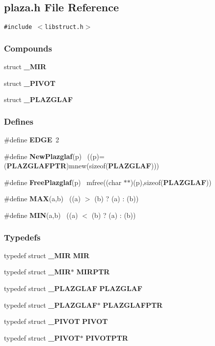 \subsection{plaza.h File Reference}
\label{plaza.h}
{\tt \#include $<$libstruct.h$>$}\par
\subsubsection*{Compounds}
\begin{CompactItemize}
\item 
struct {\bf \_\-MIR}
\item 
struct {\bf \_\-PIVOT}
\item 
struct {\bf \_\-PLAZGLAF}
\end{CompactItemize}
\subsubsection*{Defines}
\begin{CompactItemize}
\item 
\#define {\bf EDGE}\ 2
\item 
\#define {\bf New\-Plazglaf}(p) \ ((p)=({\bf PLAZGLAFPTR})mnew(sizeof({\bf PLAZGLAF})))
\item 
\#define {\bf Free\-Plazglaf}(p) \ mfree((char $\ast$$\ast$)(p),sizeof({\bf PLAZGLAF}))
\item 
\#define {\bf MAX}(a,b) \ ((a) $>$ (b) ? (a) : (b))
\item 
\#define {\bf MIN}(a,b) \ ((a) $<$ (b) ? (a) : (b))
\end{CompactItemize}
\subsubsection*{Typedefs}
\begin{CompactItemize}
\item 
typedef struct {\bf \_\-MIR}
 {\bf MIR}
\item 
typedef struct {\bf \_\-MIR}$\ast$ {\bf MIRPTR}
\item 
typedef struct {\bf \_\-PLAZGLAF}
 {\bf PLAZGLAF}
\item 
typedef struct {\bf \_\-PLAZGLAF}$\ast$ {\bf PLAZGLAFPTR}
\item 
typedef struct {\bf \_\-PIVOT}
 {\bf PIVOT}
\item 
typedef struct {\bf \_\-PIVOT}$\ast$ {\bf PIVOTPTR}
\end{CompactItemize}


